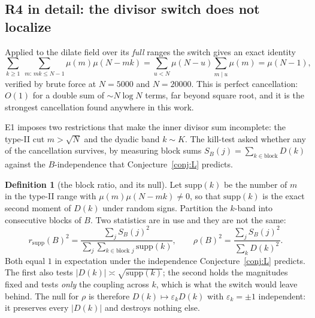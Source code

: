 \documentclass[11pt,a4paper]{article}
\theoremstyle{plain}
\theoremstyle{definition}
\newtheorem{definition}[theorem]{Definition}
\begin{document}
\subsection{R4 in detail: the divisor switch does not
localize}\label{sec:R4}

Applied to the dilate field over its \emph{full} ranges the switch
gives an exact identity
\[
  \sum_{k\ge1}\ \sum_{m:\,mk\le N-1}\mu(m)\mu(N-mk)
  = \sum_{u<N}\mu(N-u)\sum_{m\mid u}\mu(m)
  = \mu(N-1),
\]
verified by brute force at $N = 5000$ and $N = 20000$. This is perfect
cancellation: $O(1)$ for a double sum of $\sim N\log N$ terms, far
beyond square root, and it is the strongest cancellation found
anywhere in this work.

E1 imposes two restrictions that make the inner divisor sum
incomplete: the type-II cut $m > \sqrt N$ and the dyadic band
$k \sim K$. The kill-test asked whether any of the cancellation
survives, by measuring block sums $S_B(j) = \sum_{k\in\text{block}}D(k)$
against the $B$-independence that Conjecture~\ref{conj:L} predicts.

\begin{definition}[the block ratio, and its null]\label{def:blockratio}
Let $\mathrm{supp}(k)$ be the number of $m$ in the type-II range with
$\mu(m)\mu(N-mk)\neq0$, so that $\mathrm{supp}(k)$ is the exact second
moment of $D(k)$ under random signs. Partition the $k$-band into
consecutive blocks of $B$. Two statistics are in use and they are not
the same:
\[
  r_{\mathrm{supp}}(B)^2 =
    \frac{\sum_j S_B(j)^2}
         {\sum_j\sum_{k\in\text{block }j}\mathrm{supp}(k)},
  \qquad
  \rho(B)^2 =
    \frac{\sum_j S_B(j)^2}{\sum_k D(k)^2}.
\]
Both equal $1$ in expectation under the independence
Conjecture~\ref{conj:L} predicts. The first also tests
$|D(k)|\asymp\sqrt{\mathrm{supp}(k)}$; the second holds the magnitudes
fixed and tests \emph{only} the coupling across $k$, which is what the
switch would leave behind. The null for $\rho$ is therefore
$D(k)\mapsto\varepsilon_k D(k)$ with $\varepsilon_k=\pm1$
independent: it preserves every $|D(k)|$ and destroys nothing else.
\end{definition}
\end{document}
